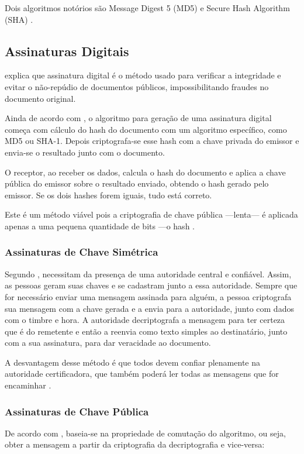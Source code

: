 \documentclass[12px,a4paper,twoside]{article}
\begin{document}
Dois algoritmos notórios são Message Digest 5 (MD5) e Secure Hash Algorithm
(SHA) \cite{tanenbaum:1}.

\subsection{Assinaturas Digitais}
\label{sec:teoria:assinaturas}
\cite{tanenbaum} explica que assinatura digital é o método usado para verificar
a integridade e evitar o não-repúdio de documentos públicos, impossibilitando
fraudes no documento original.

Ainda de acordo com \cite{tanenbaum}, o algoritmo para geração de uma
assinatura digital começa com cálculo do hash do documento com um algoritmo
específico, como MD5 ou SHA-1.  Depois criptografa-se esse hash com a chave
privada do emissor e envia-se o resultado junto com o documento.

O receptor, ao receber os dados, calcula o hash do documento e aplica a chave
pública do emissor sobre o resultado enviado, obtendo o hash gerado pelo
emissor.  Se os dois hashes forem iguais, tudo está correto.

Este é um método viável pois a criptografia de chave pública ---lenta--- é
aplicada apenas a uma pequena quantidade de bits ---o hash \cite{tanenbaum:1}.

\subsubsection{Assinaturas de Chave Simétrica}
\label{sec:teoria:assinaturas:simetricas}
Segundo \cite{tanenbaum}, necessitam da presença de uma autoridade central e
confiável.  Assim, as pessoas geram suas chaves e se cadastram junto a essa
autoridade.  Sempre que for necessário enviar uma mensagem assinada para
alguém, a pessoa criptografa sua mensagem com a chave gerada e a envia para a
autoridade, junto com dados com o timbre e hora.  A autoridade decriptografa a
mensagem para ter certeza que é do remetente e então a reenvia como texto
simples ao destinatário, junto com a sua assinatura, para dar veracidade ao
documento.

A desvantagem desse método é que todos devem confiar plenamente na autoridade
certificadora, que também poderá ler todas as mensagens que for encaminhar
\cite{tanenbaum}.

\subsubsection{Assinaturas de Chave Pública}
\label{sec:teoria:assinaturas:assimetricas}
De acordo com \cite{tanenbaum:1}, baseia-se na propriedade de comutação do
algoritmo, ou seja, obter a mensagem a partir da criptografia da decriptografia
e vice-versa:
\end{document}
